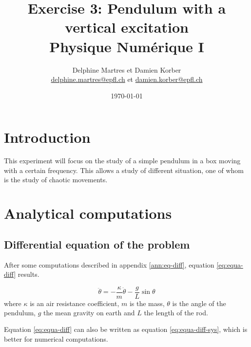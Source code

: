 \documentclass[a4paper,12pt,twoside]{article}
\newcommand{\mail}[1]{{\href{mailto:#1}{#1}}}
\begin{document}
\title{Exercise 3: Pendulum with a vertical excitation\\{\small Physique Numérique I}}
\date{\today}
\author{Delphine Martres et Damien Korber\\{\small \mail{delphine.martres@epfl.ch} et \mail{damien.korber@epfl.ch}}}
\maketitle
\tableofcontents %
\newpage %
\baselineskip=16pt
\parindent=15pt
\parskip=5pt




\section{Introduction}
This experiment will focus on the study of a simple pendulum in a box moving with a certain frequency.
This allows a study of different situation, one of whom is the study of chaotic movements.

\section{Analytical computations}
\subsection{Differential equation of the problem}
After some computations described in appendix \ref{ann:eq-diff}, equation \ref{eq:equa-diff} results.%

\begin{equation}
	\ddot{\theta} = -\frac{\kappa}{m}\dot{\theta} - \frac{g}{L}\sin\theta
	\label{eq:equa-diff}
\end{equation}
where $\kappa$ is an air resistance coefficient, $m$ is the mass, $\theta$ is the angle of the pendulum, $g$ the mean gravity on earth and $L$ the length of the rod.

Equation \ref{eq:equa-diff} can also be written as equation \ref{eq:equa-diff-sys}, which is better for numerical computations.
\end{document}
